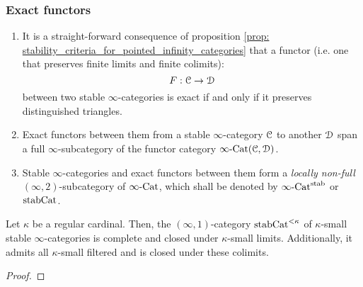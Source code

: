             \subsubsection{Exact functors}
                \begin{remark} \label{remark: functors_between_stable_infinity_categories}  
                    \noindent
                    \begin{enumerate}
                        \item It is a straight-forward consequence of proposition \ref{prop: stability_criteria_for_pointed_infinity_categories} that a functor (i.e. one that preserves finite limits and finite colimits):
                            $$F: \mathcal{C} \to \mathcal{D}$$
                        between two stable $\infty$-categories is exact if and only if it preserves distinguished triangles.
                        \item Exact functors between them from a stable $\infty$-category $\mathcal{C}$ to another $\mathcal{D}$ span a full $\infty$-subcategory of the functor category $\infty\text{-}\mathrm{Cat}(\mathcal{C}, \mathcal{D})$.
                        \item Stable $\infty$-categories and exact functors between them form a \textit{locally non-full} $(\infty, 2)$-subcategory of $\infty\text{-}\mathrm{Cat}$, which shall be denoted by $\infty\text{-}\mathrm{Cat}^{\mathrm{stab}}$ or $\mathrm{stab}\mathrm{Cat}$. 
                    \end{enumerate}
                \end{remark}
                
                \begin{proposition} \label{prop: (co)limits_of_stable_infinity_categories}  
                    Let $\kappa$ be a regular cardinal. Then, the $(\infty, 1)$-category $\mathrm{stab}\mathrm{Cat}^{< \kappa}$ of $\kappa$-small stable $\infty$-categories is complete and closed under $\kappa$-small limits. Additionally, it admits all $\kappa$-small filtered and is closed under these colimits. 
                \end{proposition}
                    \begin{proof}
                        
                    \end{proof}
                    
